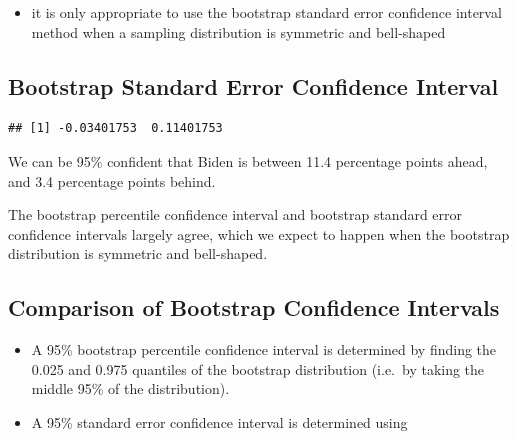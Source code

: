 \documentclass[]{book}
\newenvironment{Shaded}{\begin{snugshade}}{\end{snugshade}}
\newcommand{\KeywordTok}[1]{\textcolor[rgb]{0.13,0.29,0.53}{\textbf{#1}}}
\newcommand{\DecValTok}[1]{\textcolor[rgb]{0.00,0.00,0.81}{#1}}
\newcommand{\FloatTok}[1]{\textcolor[rgb]{0.00,0.00,0.81}{#1}}
\newcommand{\StringTok}[1]{\textcolor[rgb]{0.31,0.60,0.02}{#1}}
\newcommand{\OperatorTok}[1]{\textcolor[rgb]{0.81,0.36,0.00}{\textbf{#1}}}
\newcommand{\NormalTok}[1]{#1}
\providecommand{\tightlist}{%
  \setlength{\itemsep}{0pt}\setlength{\parskip}{0pt}}
\begin{document}
\begin{itemize}
\tightlist
\item
  it is only appropriate to use the bootstrap standard error confidence
  interval method when a sampling distribution is symmetric and
  bell-shaped
\end{itemize}

\subsection{Bootstrap Standard Error Confidence
Interval}\label{bootstrap-standard-error-confidence-interval}

\begin{Shaded}
\end{Shaded}

\begin{verbatim}
## [1] -0.03401753  0.11401753
\end{verbatim}

We can be 95\% confident that Biden is between 11.4 percentage points
ahead, and 3.4 percentage points behind.

The bootstrap percentile confidence interval and bootstrap standard
error confidence intervals largely agree, which we expect to happen when
the bootstrap distribution is symmetric and bell-shaped.

\subsection{Comparison of Bootstrap Confidence
Intervals}\label{comparison-of-bootstrap-confidence-intervals}

\begin{itemize}
\item
  A 95\% bootstrap percentile confidence interval is determined by
  finding the 0.025 and 0.975 quantiles of the bootstrap distribution
  (i.e.~by taking the middle 95\% of the distribution).
\item
  A 95\% standard error confidence interval is determined using
\end{itemize}
\end{document}
